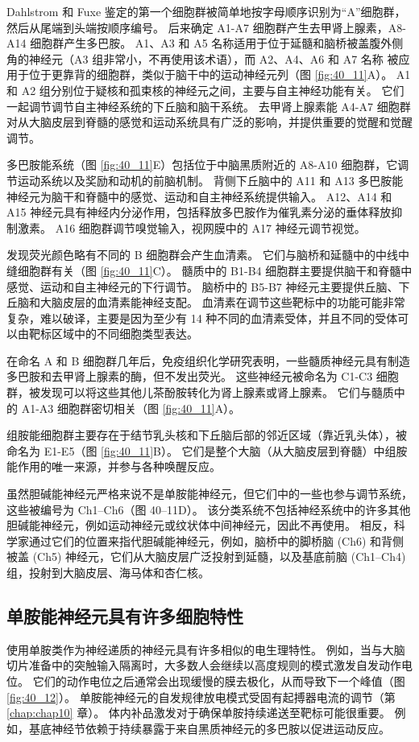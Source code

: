 Dahlstrom 和 Fuxe 鉴定的第一个细胞群被简单地按字母顺序识别为“A”细胞群，然后从尾端到头端按顺序编号。 后来确定 A1-A7 细胞群产生去甲肾上腺素，A8-A14 细胞群产生多巴胺。 A1、A3 和 A5 名称适用于位于延髓和脑桥被盖腹外侧角的神经元（A3 组非常小，不再使用该术语），而 A2、A4、A6 和 A7 名称 被应用于位于更靠背的细胞群，类似于脑干中的运动神经元列（图 \ref{fig:40_11}A）。 A1 和 A2 组分别位于疑核和孤束核的神经元之间，主要与自主神经功能有关。 它们一起调节调节自主神经系统的下丘脑和脑干系统。 去甲肾上腺素能 A4-A7 细胞群对从大脑皮层到脊髓的感觉和运动系统具有广泛的影响，并提供重要的觉醒和觉醒调节。

多巴胺能系统（图 \ref{fig:40_11}E）包括位于中脑黑质附近的 A8-A10 细胞群，它调节运动系统以及奖励和动机的前脑机制。 背侧下丘脑中的 A11 和 A13 多巴胺能神经元为脑干和脊髓中的感觉、运动和自主神经系统提供输入。 A12、A14 和 A15 神经元具有神经内分泌作用，包括释放多巴胺作为催乳素分泌的垂体释放抑制激素。 A16 细胞群调节嗅觉输入，视网膜中的 A17 神经元调节视觉。

发现荧光颜色略有不同的 B 细胞群会产生血清素。 它们与脑桥和延髓中的中线中缝细胞群有关（图 \ref{fig:40_11}C）。 髓质中的 B1-B4 细胞群主要提供脑干和脊髓中感觉、运动和自主神经元的下行调节。 脑桥中的 B5-B7 神经元主要提供丘脑、下丘脑和大脑皮层的血清素能神经支配。 血清素在调节这些靶标中的功能可能非常复杂，难以破译，主要是因为至少有 14 种不同的血清素受体，并且不同的受体可以由靶标区域中的不同细胞类型表达。

在命名 A 和 B 细胞群几年后，免疫组织化学研究表明，一些髓质神经元具有制造多巴胺和去甲肾上腺素的酶，但不发出荧光。 这些神经元被命名为 C1-C3 细胞群，被发现可以将这些其他儿茶酚胺转化为肾上腺素或肾上腺素。 它们与髓质中的 A1-A3 细胞群密切相关（图 \ref{fig:40_11}A）。

组胺能细胞群主要存在于结节乳头核和下丘脑后部的邻近区域（靠近乳头体），被命名为 E1-E5（图 \ref{fig:40_11}B）。 它们是整个大脑（从大脑皮层到脊髓）中组胺能作用的唯一来源，并参与各种唤醒反应。

虽然胆碱能神经元严格来说不是单胺能神经元，但它们中的一些也参与调节系统，这些被编号为 Ch1–Ch6（图 40–11D）。 该分类系统不包括神经系统中的许多其他胆碱能神经元，例如运动神经元或纹状体中间神经元，因此不再使用。 相反，科学家通过它们的位置来指代胆碱能神经元，例如，脑桥中的脚桥脑 (Ch6) 和背侧被盖 (Ch5) 神经元，它们从大脑皮层广泛投射到延髓，以及基底前脑 (Ch1–Ch4) 组，投射到大脑皮层、海马体和杏仁核。

\subsection{单胺能神经元具有许多细胞特性}
使用单胺类作为神经递质的神经元具有许多相似的电生理特性。 例如，当与大脑切片准备中的突触输入隔离时，大多数人会继续以高度规则的模式激发自发动作电位。 
它们的动作电位之后通常会出现缓慢的膜去极化，从而导致下一个峰值（图 \ref{fig:40_12}）。 
单胺能神经元的自发规律放电模式受固有起搏器电流的调节（第 \ref{chap:chap10} 章）。 体内补品激发对于确保单胺持续递送至靶标可能很重要。 例如，基底神经节依赖于持续暴露于来自黑质神经元的多巴胺以促进运动反应。

